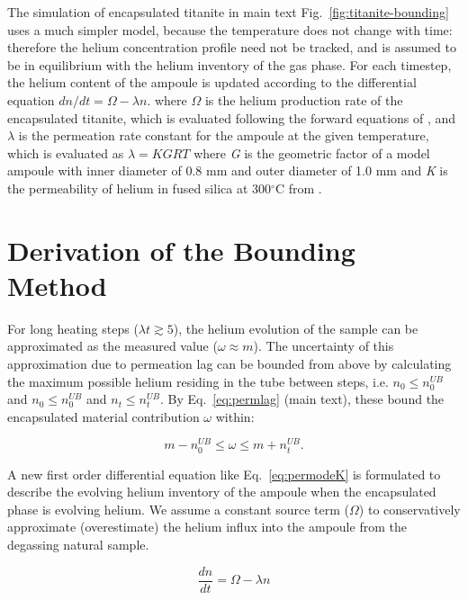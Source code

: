 The simulation of encapsulated titanite in main text Fig.~\ref{fig:titanite-bounding} uses a much simpler model, 
because the temperature does not change with time: therefore the helium concentration profile need not be tracked,  
and is assumed to be in equilibrium with the helium inventory of the gas phase. For each timestep, 
the helium content of the ampoule is updated according to the differential equation \(dn/dt = \Omega - \lambda n\).
where \(\Omega\) is the helium production rate of the encapsulated titanite, which is evaluated following the forward
equations of \citet{fechtig1966}, and \(\lambda\) is the permeation rate constant for the ampoule at the given temperature, 
which is evaluated as $\lambda = KGRT$ where \emph{G} is the geometric factor of a model ampoule with inner diameter of 0.8 mm and 
outer diameter of 1.0 mm and \emph{K} is the permeability of helium in fused silica at 300$^{\circ}$C from \citet{swets1961}.

\section{Derivation of the Bounding Method}\label{estimate-permeation-lag-uncertainty-for-uncorrected-long-heating-steps}

For long heating steps ($\lambda t \gtrsim  5$), the helium evolution of the sample can be approximated as the measured value (\(\omega \approx m\)).
The uncertainty of this approximation due to permeation lag can be bounded from above by calculating the maximum possible helium
residing in the tube between steps, i.e. 
$n_0 \leq n_{0}^{UB}$ and $n_0 \leq n_{0}^{UB}$ and $n_t \leq n_{t}^{UB}$.
By Eq.~\eqref{eq:permlag} (main text), these bound the
encapsulated material contribution \(\omega\) within:

\begin{equation}
m - n_{0}^{UB} \leq \omega \leq m + n_{t}^{UB}.
\label{eq:s6-1}
\end{equation}

A new first order differential equation like Eq.~\eqref{eq:permodeK} is formulated to describe
the evolving helium inventory of the ampoule when the encapsulated phase is evolving helium. We
assume a constant source term (\(\Omega\)) to conservatively
approximate (overestimate) the helium influx into the ampoule from the degassing
natural sample.

\begin{equation}
\frac{dn}{dt} = \Omega - \lambda n
\label{eq:s6-2}
\end{equation}

